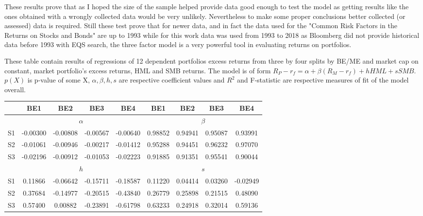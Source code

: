 \documentclass[a4paper,12pt]{article} %
\begin{document}
These results prove that as I hoped the size of the sample helped provide data good enough to test the model as getting results like the ones obtained with a wrongly collected data would be very unlikely. Nevertheless to make some proper conclusions better collected (or assessed) data is required. Still these test prove that for newer data, and in fact the data used for the "Common Risk Factors in the Returns on Stocks and Bonds" are up to 1993 while for this work data was used from 1993 to 2018 as Bloomberg did not provide historical data before 1993 with EQS search, the three factor model is a very powerful tool in evaluating returns on portfolios.
\begin{table}
	\tabcolsep=0.07cm
	\caption{\label{tab:Table2}Regression parameters of $3\times 4$ dependent return portfolio splits}
	\footnotesize
	These table contain results of regressions of 12 dependent portfolios excess returns from three by four splits by BE/ME and market cap on constant, market portfolio's excess returns, HML and SMB returns. The model is of form $R_P - r_f = \alpha + \beta (R_M - r_f) + hHML + sSMB$. $p(X)$ is p-value of some X, $\alpha, \beta, h, s$ are respective coefficient values and $R^2$ and F-statistic are respective measures of fit of the model overall.
	\newline
	\small
	\begin{longtable}{c|cccc|cccc|} 
		& BE1 & BE2& BE3& BE4& BE1 & BE2& BE3& BE4\\
		\hline
		& \multicolumn{4}{c|}{$\alpha$} & \multicolumn{4}{c|}{$\beta$}\\
		\hline
		S1 & -0.00300 & -0.00808 & -0.00567 & -0.00640 &   0.98852 &  0.94941 &  0.95087 &  0.93991\\
		S2 &  -0.01061 & -0.00946 & -0.00217 &  -0.01412 &  0.95288 &  0.94451 &   0.96232 &  0.97070\\
		S3 &  -0.02196 & -0.00912 &  -0.01053 &  -0.02223 &  0.91885 &  0.91351 &   0.95541 &  0.90044
		\vspace{0.3cm}\\
		& \multicolumn{4}{c|}{$h$} & \multicolumn{4}{c|}{$s$}\\
		\hline
		S1&   0.11866 &  -0.06642 & -0.15711 &  -0.18587 &  0.11220 &  0.04414 &  0.03260 & -0.02949\\
		S2& 0.37684 &    -0.14977 &  -0.20515 & -0.43840 &  0.26779 &   0.25898 &   0.21515 &   0.48090\\
		S3& 0.57400 &  0.00882 & -0.23891 & -0.61798 &  0.63233 &   0.24918 &   0.32014 &   0.59136
		\vspace{0.3cm}\\

\end{longtable}
\end{table}
\end{document}
